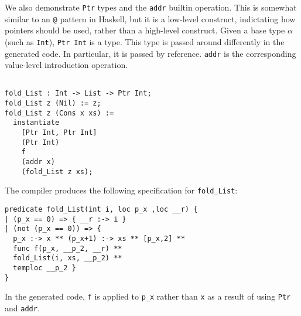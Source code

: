 We also demonstrate \verb|Ptr| types and the \verb|addr| builtin operation. This is somewhat similar to an \verb|@| pattern in Haskell,
but it is a low-level construct, indictating how pointers should be used, rather than a high-level construct.
Given a base type $\alpha$ (such as \verb|Int|), \verb|Ptr Int| is a type. This type is
passed around differently in the generated code. In particular, it is passed by reference.
\verb|addr| is the corresponding value-level introduction operation.
\begin{lstlisting}[language=Pika]
%generate fold_List [Int, Sll] (Ptr Int)

fold_List : Int -> List -> Ptr Int;
fold_List z (Nil) := z;
fold_List z (Cons x xs) :=
  instantiate
    [Ptr Int, Ptr Int]
    (Ptr Int)
    f
    (addr x)
    (fold_List z xs);
\end{lstlisting}

\noindent
The compiler produces the following \SuSLik{} specification for \verb|fold_List|:

\begin{lstlisting}[language=SynLang]
predicate fold_List(int i, loc p_x ,loc __r) {
| (p_x == 0) => { __r :-> i }
| (not (p_x == 0)) => {
  p_x :-> x ** (p_x+1) :-> xs ** [p_x,2] **
  func f(p_x, __p_2, __r) **
  fold_List(i, xs, __p_2) **
  temploc __p_2 }
}
\end{lstlisting}
%
In the generated code, \verb|f| is applied to \verb|p_x| rather than
\verb|x| as a result of using \verb|Ptr| and \verb|addr|.

